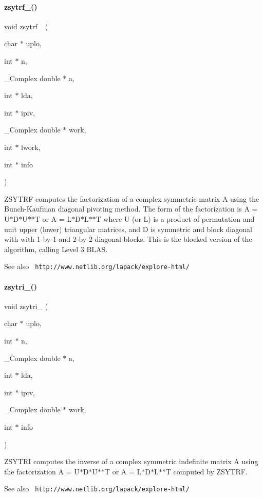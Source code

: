 \paragraph{zsytrf\_()}
{\footnotesize\ttfamily void zsytrf\+\_\+ (\begin{DoxyParamCaption}\item[{char $\ast$}]{uplo,  }\item[{int $\ast$}]{n,  }\item[{\+\_\+\+Complex double $\ast$}]{a,  }\item[{int $\ast$}]{lda,  }\item[{int $\ast$}]{ipiv,  }\item[{\+\_\+\+Complex double $\ast$}]{work,  }\item[{int $\ast$}]{lwork,  }\item[{int $\ast$}]{info }\end{DoxyParamCaption})}

Z\+S\+Y\+T\+RF computes the factorization of a complex symmetric matrix A using the Bunch-\/\+Kaufman diagonal pivoting method. The form of the factorization is A = U$\ast$\+D$\ast$\+U$\ast$$\ast$T or A = L$\ast$\+D$\ast$\+L$\ast$$\ast$T where U (or L) is a product of permutation and unit upper (lower) triangular matrices, and D is symmetric and block diagonal with with 1-\/by-\/1 and 2-\/by-\/2 diagonal blocks. This is the blocked version of the algorithm, calling Level 3 B\+L\+AS. \begin{DoxySeeAlso}{See also}
{\texttt{ http\+://www.\+netlib.\+org/lapack/explore-\/html/}} 
\end{DoxySeeAlso}
\mbox{\label{lapack_8h_ae705b6c33da659b7e71b19e99be38341}} 
\paragraph{zsytri\_()}
{\footnotesize\ttfamily void zsytri\+\_\+ (\begin{DoxyParamCaption}\item[{char $\ast$}]{uplo,  }\item[{int $\ast$}]{n,  }\item[{\+\_\+\+Complex double $\ast$}]{a,  }\item[{int $\ast$}]{lda,  }\item[{int $\ast$}]{ipiv,  }\item[{\+\_\+\+Complex double $\ast$}]{work,  }\item[{int $\ast$}]{info }\end{DoxyParamCaption})}

Z\+S\+Y\+T\+RI computes the inverse of a complex symmetric indefinite matrix A using the factorization A = U$\ast$\+D$\ast$\+U$\ast$$\ast$T or A = L$\ast$\+D$\ast$\+L$\ast$$\ast$T computed by Z\+S\+Y\+T\+RF. \begin{DoxySeeAlso}{See also}
{\texttt{ http\+://www.\+netlib.\+org/lapack/explore-\/html/}} 
\end{DoxySeeAlso}
